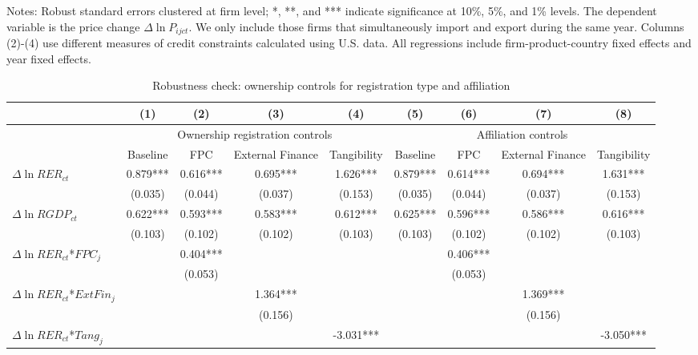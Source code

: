 \documentclass[12pt]{article}
\begin{document}
\begin{table}
\begin{threeparttable}
		\begin{tablenotes}
			\footnotesize
			\item[Notes:] Robust standard errors clustered at firm level; *, **, and *** indicate significance at 10\%, 5\%, and 1\% levels. The dependent variable is the price change $\Delta \ln P_{ijct}$. We only include those firms that simultaneously import and export during the same year. Columns (2)-(4) use different measures of credit constraints calculated using U.S. data. All regressions include firm-product-country fixed effects and year fixed effects.
		\end{tablenotes}
	\end{threeparttable}
	\label{tab.robust.tradetype}
\end{table}

\begin{table}
	\centering
	\caption{Robustness check: ownership controls for registration type and affiliation}
	\begin{threeparttable}
		\begin{tabular}{lcccccccc}
			\toprule
			& (1)   & (2)   & (3)   & (4) &  (5)  &  (6)  & (7)  & (8)\\
			\midrule
			& \multicolumn{4}{c}{Ownership registration controls} & \multicolumn{4}{c}{Affiliation controls}\\
			& Baseline & FPC   & External Finance & Tangibility & Baseline & FPC & External Finance & Tangibility\\
			\midrule
			$\Delta \ln RER_{ct}$ & 0.879*** & 0.616*** & 0.695*** & 1.626*** & 0.879*** & 0.614*** & 0.694*** & 1.631***  \\
			& (0.035) & (0.044) & (0.037) & (0.153) & (0.035) & (0.044) & (0.037) & (0.153) \\
			$\Delta \ln RGDP_{ct}$ & 0.622*** & 0.593*** & 0.583*** & 0.612*** & 0.625*** & 0.596*** & 0.586*** & 0.616*** \\
			& (0.103) & (0.102) & (0.102) & (0.103) & (0.103) & (0.102) & (0.102) & (0.103) \\
			$\Delta \ln RER_{ct}$*$FPC_{j}$ &       & 0.404*** &       &  &  & 0.406*** &&\\
			&       & (0.053) &       &  &  & (0.053) &&\\
			$\Delta \ln RER_{ct}$*$ExtFin_{j}$ &       &       & 1.364*** &  &&&1.369***&\\
			&       &       & (0.156) &  &&&(0.156)&\\
			$\Delta \ln RER_{ct}$*$Tang_{j}$ &       &       &       & -3.031*** &&&&-3.050***\\

\end{tabular}
\end{threeparttable}
\end{table}
\end{document}

